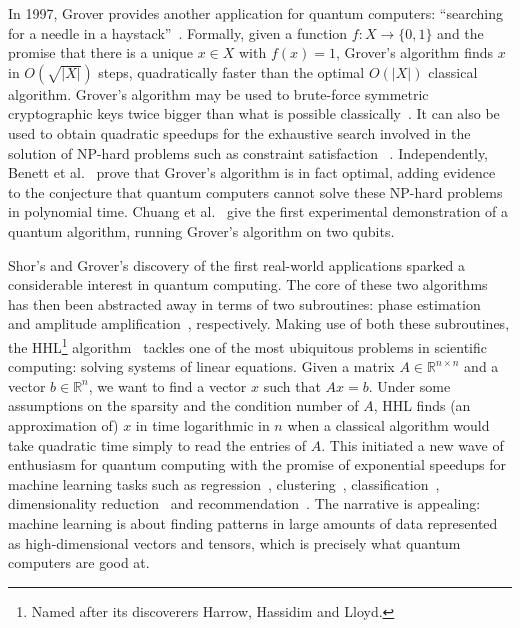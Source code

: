 In 1997, Grover provides another application for quantum computers:
``searching for a needle in a haystack''~\cite{Grover97}. Formally,
given a function $f : X \to \{0, 1\}$ and the promise that
there is a unique $x \in X$ with $f(x) = 1$, Grover's algorithm finds
$x$ in $O(\sqrt{|X|})$ steps, quadratically faster than the optimal
$O(|X|)$ classical algorithm. Grover's algorithm may be used to
brute-force symmetric cryptographic keys twice bigger than what is
possible classically~\cite{BernsteinEtAl09}. It can also be used to
obtain quadratic speedups for the exhaustive search involved in the
solution of NP-hard problems such as constraint satisfaction
~\cite{Ambainis04}. Independently, Benett et al.~\cite{BennettEtAl97}
prove that Grover's algorithm is in fact optimal, adding evidence to the
conjecture that quantum computers cannot solve these NP-hard problems in
polynomial time. Chuang et al.~\cite{ChuangEtAl98} give
the first experimental demonstration of a quantum algorithm, running
Grover's algorithm on two qubits.

Shor's and Grover's discovery of the first real-world applications
sparked a considerable interest in quantum computing. The core of these
two algorithms has then been abstracted away in terms of two
subroutines: phase estimation~\cite{Kitaev95} and amplitude
amplification~\cite{BrassardEtAl02}, respectively. Making use of both
these subroutines, the
HHL\footnote{Named after its discoverers Harrow, Hassidim and Lloyd.}
algorithm~\cite{HarrowEtAl09} tackles one of
the most ubiquitous problems in scientific computing: solving systems of linear
equations. Given a matrix $A \in \mathbb{R}^{n \times n}$ and a vector
${b} \in \mathbb{R}^{n}$, we want to find a vector ${x}$ such that
$A {x} = {b}$. Under some assumptions on the sparsity and the condition
number of $A$, HHL finds (an approximation of) $x$ in time logarithmic in $n$
when a classical algorithm would take quadratic time simply to read the entries
of $A$. This initiated a new wave of enthusiasm for quantum computing
with the promise of exponential speedups for machine learning tasks such as
regression~\cite{WiebeEtAl12}, clustering~\cite{LloydEtAl13},
classification~\cite{RebentrostEtAl14}, dimensionality
reduction~\cite{LloydEtAl14} and recommendation~\cite{KerenidisPrakash16}.
The narrative is appealing: machine learning is about finding patterns
in large amounts of data represented as high-dimensional vectors and tensors,
which is precisely what quantum computers are good at.

